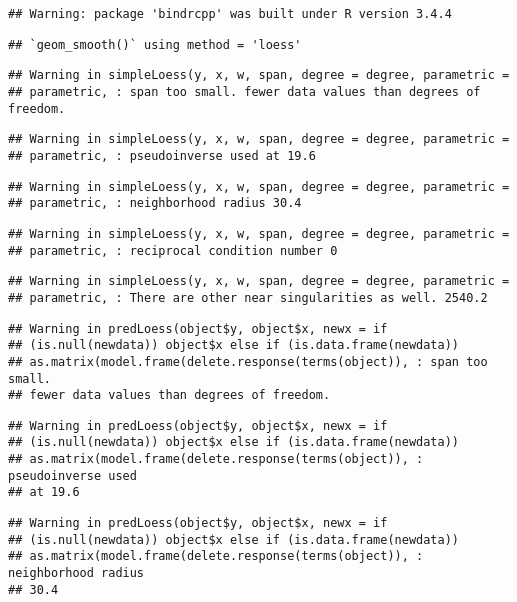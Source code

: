 \documentclass[]{article}
\begin{document}
\begin{verbatim}
## Warning: package 'bindrcpp' was built under R version 3.4.4
\end{verbatim}

\begin{verbatim}
## `geom_smooth()` using method = 'loess'
\end{verbatim}

\begin{verbatim}
## Warning in simpleLoess(y, x, w, span, degree = degree, parametric =
## parametric, : span too small. fewer data values than degrees of freedom.
\end{verbatim}

\begin{verbatim}
## Warning in simpleLoess(y, x, w, span, degree = degree, parametric =
## parametric, : pseudoinverse used at 19.6
\end{verbatim}

\begin{verbatim}
## Warning in simpleLoess(y, x, w, span, degree = degree, parametric =
## parametric, : neighborhood radius 30.4
\end{verbatim}

\begin{verbatim}
## Warning in simpleLoess(y, x, w, span, degree = degree, parametric =
## parametric, : reciprocal condition number 0
\end{verbatim}

\begin{verbatim}
## Warning in simpleLoess(y, x, w, span, degree = degree, parametric =
## parametric, : There are other near singularities as well. 2540.2
\end{verbatim}

\begin{verbatim}
## Warning in predLoess(object$y, object$x, newx = if
## (is.null(newdata)) object$x else if (is.data.frame(newdata))
## as.matrix(model.frame(delete.response(terms(object)), : span too small.
## fewer data values than degrees of freedom.
\end{verbatim}

\begin{verbatim}
## Warning in predLoess(object$y, object$x, newx = if
## (is.null(newdata)) object$x else if (is.data.frame(newdata))
## as.matrix(model.frame(delete.response(terms(object)), : pseudoinverse used
## at 19.6
\end{verbatim}

\begin{verbatim}
## Warning in predLoess(object$y, object$x, newx = if
## (is.null(newdata)) object$x else if (is.data.frame(newdata))
## as.matrix(model.frame(delete.response(terms(object)), : neighborhood radius
## 30.4
\end{verbatim}
\end{document}
